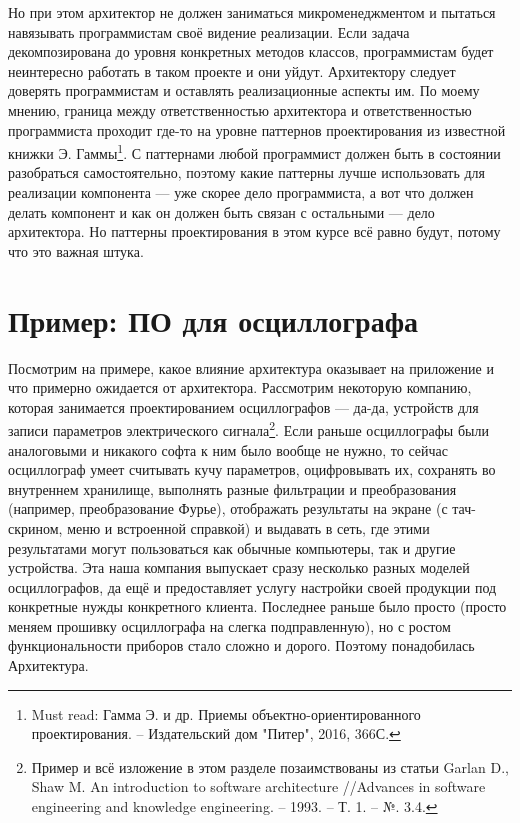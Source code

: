 \documentclass[a5paper]{article}
\begin{document}
Но при этом архитектор не должен заниматься микроменеджментом и пытаться навязывать программистам своё видение реализации. Если задача декомпозирована до уровня конкретных методов классов, программистам будет неинтересно работать в таком проекте и они уйдут. Архитектору следует доверять программистам и оставлять реализационные аспекты им. По моему мнению, граница между ответственностью архитектора и ответственностью программиста проходит где-то на уровне паттернов проектирования из известной книжки Э. Гаммы\footnote{Must read: Гамма Э. и др. Приемы объектно-ориентированного проектирования. -- Издательский дом "Питер", 2016, 366С.}. С паттернами любой программист должен быть в состоянии разобраться самостоятельно, поэтому какие паттерны лучше использовать для реализации компонента --- уже скорее дело программиста, а вот что должен делать компонент и как он должен быть связан с остальными --- дело архитектора. Но паттерны проектирования в этом курсе всё равно будут, потому что это важная штука.

\section{Пример: ПО для осциллографа}

Посмотрим на примере, какое влияние архитектура оказывает на приложение и что примерно ожидается от архитектора. Рассмотрим некоторую компанию, которая занимается проектированием осциллографов --- да-да, устройств для записи параметров электрического сигнала\footnote{Пример и всё изложение в этом разделе позаимствованы из статьи Garlan D., Shaw M. An introduction to software architecture //Advances in software engineering and knowledge engineering. -- 1993. -- Т. 1. -- №. 3.4.}. Если раньше осциллографы были аналоговыми и никакого софта к ним было вообще не нужно, то сейчас осциллограф умеет считывать кучу параметров, оцифровывать их, сохранять во внутреннем хранилище, выполнять разные фильтрации и преобразования (например, преобразование Фурье), отображать результаты на экране (с тач-скрином, меню и встроенной справкой) и выдавать в сеть, где этими результатами могут пользоваться как обычные компьютеры, так и другие устройства. Эта наша компания выпускает сразу несколько разных моделей осциллографов, да ещё и предоставляет услугу настройки своей продукции под конкретные нужды конкретного клиента. Последнее раньше было просто (просто меняем прошивку осциллографа на слегка подправленную), но с ростом функциональности приборов стало сложно и дорого. Поэтому понадобилась Архитектура.
\end{document}
